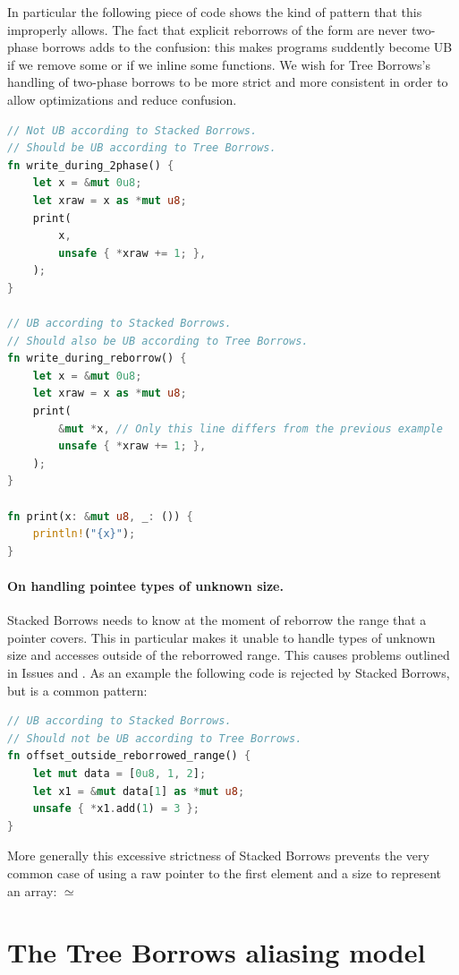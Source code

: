 \documentclass[a4paper,11pt]{article}
\theoremstyle{plain}
\theoremstyle{definition}
\theoremstyle{remark}
\newcommand{\tcode}[1]{\rstinline{#1}}
\begin{document}
In particular the following piece of code shows the kind of pattern that this
improperly allows. The fact that explicit reborrows of the form \tcode{\&mut *x}
are never two-phase borrows adds to the confusion: this makes programs suddently
become UB if we remove some \tcode{\&mut*} or if we inline some functions.
We wish for Tree Borrows's handling of two-phase borrows to be more strict and
more consistent in order to allow optimizations and reduce confusion.
\begin{lstlisting}[language=rust]
// Not UB according to Stacked Borrows.
// Should be UB according to Tree Borrows.
fn write_during_2phase() {
    let x = &mut 0u8;
    let xraw = x as *mut u8;
    print(
        x,
        unsafe { *xraw += 1; },
    );
}

// UB according to Stacked Borrows.
// Should also be UB according to Tree Borrows.
fn write_during_reborrow() {
    let x = &mut 0u8;
    let xraw = x as *mut u8;
    print(
        &mut *x, // Only this line differs from the previous example
        unsafe { *xraw += 1; },
    );
}

fn print(x: &mut u8, _: ()) {
    println!("{x}");
}
\end{lstlisting}

\paragraph*{On handling pointee types of unknown size.}
Stacked Borrows needs to know at the moment of reborrow the range that a pointer
covers. This in particular makes it unable to handle types of unknown size and
accesses outside of the reborrowed range. This causes problems outlined in Issues
\cite{issue_raw_range_strict} and \cite{issue_extern_type}.
As an example the following code is rejected by Stacked Borrows, but
is a common pattern:
\begin{lstlisting}[language=rust]
// UB according to Stacked Borrows.
// Should not be UB according to Tree Borrows.
fn offset_outside_reborrowed_range() {
    let mut data = [0u8, 1, 2];
    let x1 = &mut data[1] as *mut u8;
    unsafe { *x1.add(1) = 3 };
}
\end{lstlisting}
More generally this excessive strictness of Stacked Borrows prevents the very
common case of using a raw pointer to the first element and a size to represent an array:
\tcode{(*mut T, usize)} \(\simeq\) \tcode{&[T]}

\section{The Tree Borrows aliasing model}
\end{document}
